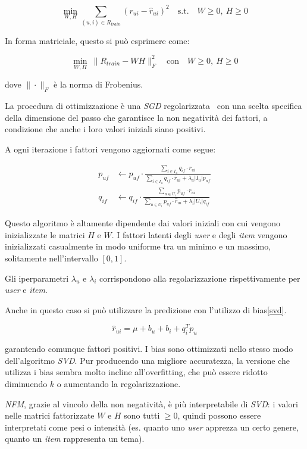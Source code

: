 \[
\min_{W, H} \sum_{(u,i) \in R_{train}} \left( r_{ui} - \hat{r}_{ui} \right)^2 \quad \text{s.t.} \quad W \geq 0,\ H \geq 0
\]

In forma matriciale, questo si può esprimere come:

\[
\min_{W, H} \ \| R_{train} - WH \|_F^2 \quad \text{con} \quad W \geq 0,\ H \geq 0
\]

dove $\| \cdot \|_F$ è la norma di Frobenius.

La procedura di ottimizzazione è una \textit{SGD} regolarizzata~\cite{NMF} con una scelta specifica della dimensione del passo che garantisce la non negatività dei fattori, a condizione che anche i loro valori iniziali siano positivi.

A ogni iterazione i fattori vengono aggiornati come segue:

\[
\begin{aligned}
p_{uf} &\leftarrow p_{uf} \cdot \frac{\sum\limits_{i \in I_u} q_{if} \cdot r_{ui}}{\sum\limits_{i \in I_u} q_{if} \cdot \hat{r}_{ui} + \lambda_u |I_u| p_{uf}} \\
q_{if} &\leftarrow q_{if} \cdot \frac{\sum\limits_{u \in U_i} p_{uf} \cdot r_{ui}}{\sum\limits_{u \in U_i} p_{uf} \cdot \hat{r}_{ui} + \lambda_i |U_i| q_{if}}
\end{aligned}
\]

Questo algoritmo è altamente dipendente dai valori iniziali con cui vengono inizializzate le matrici $H$ e $W$. I fattori latenti degli \textit{user} e degli \textit{item} vengono inizializzati casualmente in modo uniforme tra un minimo e un massimo, solitamente nell'intervallo $[0, 1]$.

Gli iperparametri $\lambda_u$ e $\lambda_i$ corrispondono alla regolarizzazione rispettivamente per \textit{user} e \textit{item}.

Anche in questo caso si può utilizzare la predizione con l'utilizzo di bias\ref{svd}.

\[
\hat{r}_{ui} = \mu + b_u + b_i + q_i^T p_u
\]

garantendo comunque fattori positivi. I bias sono ottimizzati nello stesso modo dell'algoritmo \textit{SVD}. Pur producendo una migliore accuratezza, la versione che utilizza i bias sembra molto incline all'overfitting, che può essere ridotto diminuendo $k$ o aumentando la regolarizzazione.

\textit{NFM}, grazie al vincolo della non negatività, è più interpretabile di \textit{SVD}: i valori nelle matrici fattorizzate $W$ e $H$ sono tutti $\geq 0$, quindi possono essere interpretati come pesi o intensità (es. quanto uno \textit{user} apprezza un certo genere, quanto un \textit{item} rappresenta un tema).

